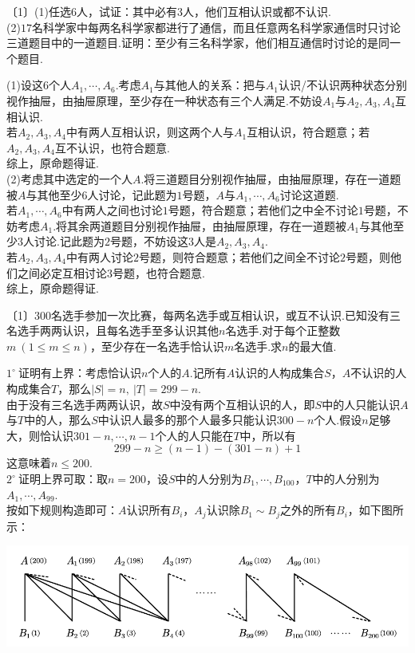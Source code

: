 \documentclass[lang=cn, zihao=4.5]{elegantbook}
\newcommand{\nd}[1]{〔#1〕}
\newcommand{\buzhou}[1]{$#1^{\circ} \ $}
\begin{document}
\begin{example} %
	\nd{1}(1)任选$6$人，试证：其中必有$3$人，他们互相认识或都不认识. \\
	(2)$17$名科学家中每两名科学家都进行了通信，而且任意两名科学家通信时只讨论三道题目中的一道题目.证明：至少有三名科学家，他们相互通信时讨论的是同一个题目.
\end{example}
\begin{solution}
	(1)设这$6$个人$A_1, \cdots ,A_6$.考虑$A_1$与其他人的关系：把与$A_1$认识/不认识两种状态分别视作抽屉，由抽屉原理，至少存在一种状态有三个人满足.不妨设$A_1$与$A_2,A_3,A_4$互相认识. \\
	若$A_2,A_3,A_4$中有两人互相认识，则这两个人与$A_1$互相认识，符合题意；若$A_2,A_3,A_4$互不认识，也符合题意. \\ 
	综上，原命题得证. \\
	(2)考虑其中选定的一个人$A$.将三道题目分别视作抽屉，由抽屉原理，存在一道题被$A$与其他至少$6$人讨论，记此题为$1$号题，$A$与$A_1, \cdots ,A_6$讨论这道题. \\
	若$A_1, \cdots ,A_6$中有两人之间也讨论$1$号题，符合题意；若他们之中全不讨论$1$号题，不妨考虑$A_1$.将其余两道题目分别视作抽屉，由抽屉原理，存在一道题被$A_1$与其他至少$3$人讨论.记此题为$2$号题，不妨设这$3$人是$A_2,A_3,A_4$. \\
	若$A_2,A_3,A_4$中有两人讨论$2$号题，则符合题意；若他们之间全不讨论$2$号题，则他们之间必定互相讨论$3$号题，也符合题意. \\
	综上，原命题得证.
\end{solution}

\begin{example} %
	\nd{1}$300$名选手参加一次比赛，每两名选手或互相认识，或互不认识.已知没有三名选手两两认识，且每名选手至多认识其他$n$名选手.对于每个正整数$m~(1 \leq m \leq n)$，至少存在一名选手恰认识$m$名选手.求$n$的最大值.
\end{example}
\begin{solution}
	\buzhou{1}证明有上界：考虑恰认识$n$个人的$A$.记所有$A$认识的人构成集合$S$，$A$不认识的人构成集合$T$，那么$|S|=n,~|T|=299-n$. \\
	由于没有三名选手两两认识，故$S$中没有两个互相认识的人，即$S$中的人只能认识$A$与$T$中的人，那么$S$中认识人最多的那个人最多只能认识$300-n$个人.假设$n$足够大，则恰认识$301-n, \cdots ,n-1$个人的人只能在$T$中，所以有$$299-n \geq (n-1) - (301-n) + 1$$
	这意味着$n \leq 200$. \\
	\buzhou{2}证明上界可取：取$n=200$，设$S$中的人分别为$B_1, \cdots , B_{100}$，$T$中的人分别为$A_1, \cdots ,A_{99}$. \\
	按如下规则构造即可：$A$认识所有$B_i$，$A_j$认识除$B_1 \sim B_{j}$之外的所有$B_i$，如下图所示：
	\begin{center}
		\includegraphics[width=14cm]{attachment/20230207.pdf}
	\end{center}
\end{solution}
\end{document}
